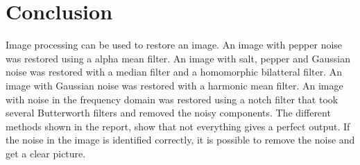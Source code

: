 \section{Conclusion}

Image processing can be used to restore an image.
An image with pepper noise was restored using a alpha mean filter.
An image with salt, pepper and Gaussian noise was restored with a median filter and a homomorphic bilatteral filter.
An image with Gaussian noise was restored with a harmonic mean filter.
An image with noise in the frequency domain was restored using a notch filter that took several Butterworth filters and removed the noisy components.
The different methods shown in the report, show that not everything gives a perfect output.
If the noise in the image is identified correctly, it is possible to remove the noise and get a clear picture.